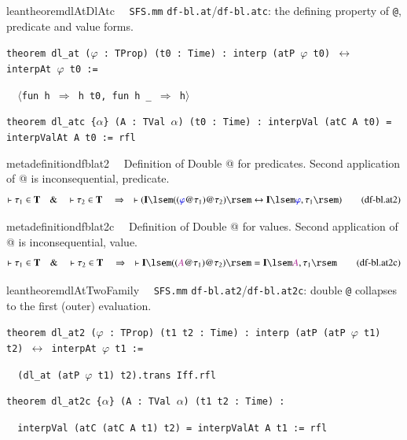 \begin{restatable}{leantheorem}{dlAtDlAtc}~~ \texttt{SFS.mm} \texttt{df-bl.at}/\texttt{df-bl.atc}: the defining property of \texttt{@}, predicate and value forms.

\texttt{\textcolor{leancolor}{theorem} \textcolor{leanyellow}{dl\_at} ($\varphi$ : TProp) (t0 : Time) : interp (atP $\varphi$ t0) $\leftrightarrow$ interpAt $\varphi$ t0 :=}

\texttt{~~$\langle$\textcolor{leancolor}{fun} h $\Rightarrow$ h t0, \textcolor{leancolor}{fun} h \_ $\Rightarrow$ h$\rangle$}

\texttt{\textcolor{leancolor}{theorem} \textcolor{leanyellow}{dl\_atc} \{$\alpha$\} (A : TVal $\alpha$) (t0 : Time) : interpVal (atC A t0) = interpValAt A t0 := rfl}
\label{dl_at}
\label{dl_atc}
\end{restatable}

\begin{restatable}{metadefinition}{dfblat2}~~ Definition of Double @ for predicates.
   Second application of @ is inconsequential, predicate.
\begin{align}
\vdash \tau_1 \in \mathbf{T}\quad\&\quad \vdash \tau_2 \in
    \mathbf{T}\quad\Rightarrow\quad \vdash ( \mathbf{I} \lsem ( ( \mw{\varphi}
    @ \tau_1 ) @ \tau_2 ) \rsem \leftrightarrow \mathbf{I} \lsem \mw{\varphi} ,
    \tau_1 \rsem )\label{eq:df-bl.at2}\tag{df-bl.at2}
\end{align}
\end{restatable}

\begin{restatable}{metadefinition}{dfblat2c}~~ Definition of Double @ for values.
   Second application of @ is inconsequential, value.
\begin{align}
\vdash \tau_1 \in \mathbf{T}\quad\&\quad \vdash \tau_2 \in
    \mathbf{T}\quad\Rightarrow\quad \vdash \mathbf{I} \lsem ( ( \mc{A} @ \tau_1
    ) @ \tau_2 ) \rsem = \mathbf{I} \lsem \mc{A} , \tau_1
    \rsem\label{eq:df-bl.at2c}\tag{df-bl.at2c}
\end{align}
\end{restatable}

\begin{restatable}{leantheorem}{dlAtTwoFamily}~~ \texttt{SFS.mm} \texttt{df-bl.at2}/\texttt{df-bl.at2c}: double \texttt{@} collapses to the first (outer) evaluation.

\texttt{\textcolor{leancolor}{theorem} \textcolor{leanyellow}{dl\_at2} ($\varphi$ : TProp) (t1 t2 : Time) : interp (atP (atP $\varphi$ t1) t2) $\leftrightarrow$ interpAt $\varphi$ t1 :=}

\texttt{~~(dl\_at (atP $\varphi$ t1) t2).trans Iff.rfl}

\texttt{\textcolor{leancolor}{theorem} \textcolor{leanyellow}{dl\_at2c} \{$\alpha$\} (A : TVal $\alpha$) (t1 t2 : Time) :}

\texttt{~~interpVal (atC (atC A t1) t2) = interpValAt A t1 := rfl}
\label{dl_at2}
\label{dl_at2c}
\end{restatable}

